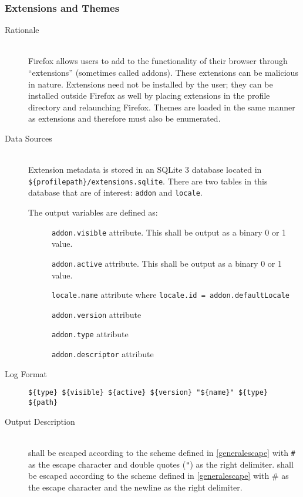 \subsubsection{Extensions and Themes}
\begin{description}
\item[Rationale] \hfill \\
Firefox allows users to add to the functionality of their browser through
``extensions'' (sometimes called addons).  These extensions can be malicious in
nature.  Extensions need not be installed by the user; they can be installed
outside Firefox as well by placing extensions in the profile directory and
relaunching Firefox.  Themes are loaded in the same manner as extensions and
therefore must also be enumerated.
\item[Data Sources] \hfill \\
Extension metadata is stored in an SQLite 3 database located in \\
\verb|${profilepath}/extensions.sqlite|.  There are two tables in this database
that are of interest: \verb|addon| and \verb|locale|. 
 
The output variables are defined as:
\begin{description}
  \item[] \verb|addon.visible| attribute.  This shall be output as
  a binary 0 or 1 value.
  \item[] \verb|addon.active| attribute.  This shall be output as a
  binary 0 or 1 value.
  \item[] \verb|locale.name| attribute where \texttt{locale.id =
  addon.defaultLocale}
  \item[] \verb|addon.version| attribute
  \item[] \verb|addon.type| attribute
  \item[] \verb|addon.descriptor| attribute
\end{description}
\item[Log Format] \hfill 
\vspace{-\baselineskip}
\begin{verbatim}
${type} ${visible} ${active} ${version} "${name}" ${type} ${path}
\end{verbatim}
\item[Output Description] \hfill \\
 shall be escaped according to the scheme defined in
\ref{generalescape} with \verb|#| as the escape character and double quotes
(\verb|"|) as the right delimiter.   shall be escaped according to
the scheme defined in \ref{generalescape} with \# as the escape character and
the newline as the right delimiter.
  

\end{description}

